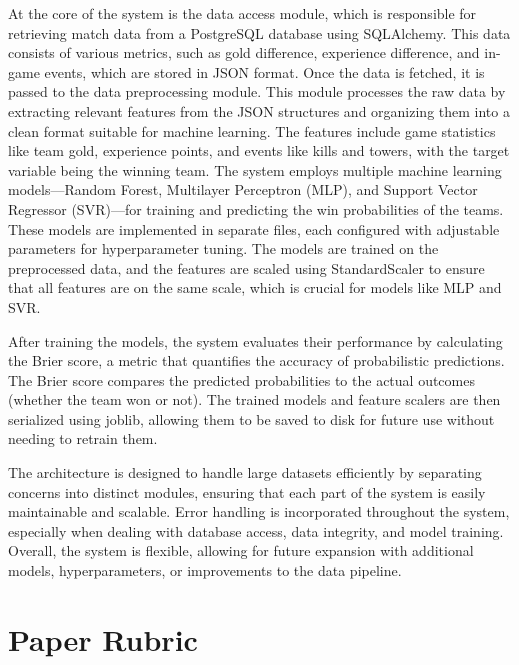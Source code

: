 \documentclass[10pt,twocolumn]{article}
\begin{document}
At the core of the system is the data access module, which is responsible for retrieving match data from a PostgreSQL database using SQLAlchemy. This data consists of various metrics, such as gold difference, experience difference, and in-game events, which are stored in JSON format. Once the data is fetched, it is passed to the data preprocessing module. This module processes the raw data by extracting relevant features from the JSON structures and organizing them into a clean format suitable for machine learning. The features include game statistics like team gold, experience points, and events like kills and towers, with the target variable being the winning team.
The system employs multiple machine learning models—Random Forest, Multilayer Perceptron (MLP), and Support Vector Regressor (SVR)—for training and predicting the win probabilities of the teams. These models are implemented in separate files, each configured with adjustable parameters for hyperparameter tuning. The models are trained on the preprocessed data, and the features are scaled using StandardScaler to ensure that all features are on the same scale, which is crucial for models like MLP and SVR.

After training the models, the system evaluates their performance by calculating the Brier score, a metric that quantifies the accuracy of probabilistic predictions. The Brier score compares the predicted probabilities to the actual outcomes (whether the team won or not). The trained models and feature scalers are then serialized using joblib, allowing them to be saved to disk for future use without needing to retrain them.

The architecture is designed to handle large datasets efficiently by separating concerns into distinct modules, ensuring that each part of the system is easily maintainable and scalable. Error handling is incorporated throughout the system, especially when dealing with database access, data integrity, and model training. Overall, the system is flexible, allowing for future expansion with additional models, hyperparameters, or improvements to the data pipeline.

\section{Paper Rubric}

\printbibliography
\end{document}
